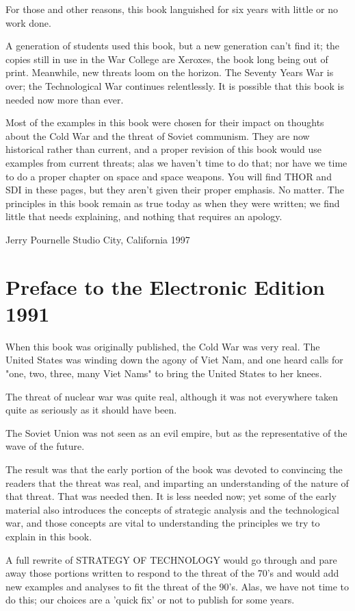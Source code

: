 For those and other reasons, this book languished for six years with little or no work done.

A generation of students used this book, but a new generation can’t find it; the copies still in use in the War College are Xeroxes, the book long being out of print. Meanwhile, new threats loom on the horizon. The Seventy Years War is over; the Technological War continues relentlessly. It is possible that this book is needed now more than ever.

Most of the examples in this book were chosen for their impact on thoughts about the Cold War and the threat of Soviet communism. They are now historical rather than current, and a proper revision of this book would use examples from current threats; alas we haven’t time to do that; nor have we time to do a proper chapter on space and space weapons. You will find THOR and SDI in these pages, but they aren’t given their proper emphasis. No matter. The principles in this book remain as true today as when they were written; we find little that needs explaining, and nothing that requires an apology.

Jerry Pournelle
Studio City, California 1997

\section{Preface to the Electronic Edition 1991}
When this book was originally published, the Cold War was very real. The United States was winding down the agony of Viet Nam, and one heard calls for "one, two, three, many Viet Nams" to bring the United States to her knees.

The threat of nuclear war was quite real, although it was not everywhere taken quite as seriously as it should have been.

The Soviet Union was not seen as an evil empire, but as the representative of the wave of the future.

The result was that the early portion of the book was devoted to convincing the readers that the threat was real, and imparting an understanding of the nature of that threat. That was needed then. It is less needed now; yet some of the early material also introduces the concepts of strategic analysis and the technological war, and those concepts are vital to understanding the principles we try to explain in this book.

A full rewrite of STRATEGY OF TECHNOLOGY would go through and pare away those portions written to respond to the threat of the 70's and would add new examples and analyses to fit the threat of the 90's. Alas, we have not time to do this; our choices are a 'quick fix' or not to publish for some years.

